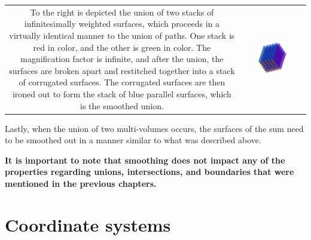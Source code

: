 \begin{tabular}{cc}
\parbox{0.5\textwidth}{
To the right is depicted the union of two stacks of infinitesimally weighted surfaces, which proceeds in a virtually identical manner to the union of paths. One stack is red in color, and the other is green in color. The magnification factor is infinite, and after the union, the surfaces are broken apart and restitched together into a stack of corrugated surfaces. The corrugated surfaces are then ironed out to form the stack of blue parallel surfaces, which is the smoothed union.
} & \parbox{0.5\textwidth}{
\includegraphics[width = 0.5\textwidth]{Smoothness_and_duality/surface_union_smoothing}
}
\end{tabular}

Lastly, when the union of two multi-volumes occurs, the surfaces of the sum need to be smoothed out in a manner similar to what was described above.

{\bf It is important to note that smoothing does not impact any of the properties regarding unions, intersections, and boundaries that were mentioned in the previous chapters.}





\section{Coordinate systems}

